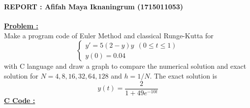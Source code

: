 \documentclass[a4paper,10pt]{article}
\begin{document}
	
	\textbf{REPORT : Afifah Maya Iknaningrum (1715011053)} \\ \\
	\underline{\textbf{Problem :}}\\
	Make a program code of Euler Method and classical Runge-Kutta for
	\[\begin{cases}
	y' = 5(2-y)y \ \ (0 \leq t \leq 1)\\
	y(0) = 0.04
	\end{cases}\]
	with C language and draw a graph to compare the numerical solution and exact solution for $ N =4,8,16,32,64,128 $ and $ h=1/N $. The exact solution is
	\[ y(t) = \dfrac{2}{1+49e^{-10t}} \]
	\underline{\textbf{C Code :}} \\
	
	
	
\end{document}
